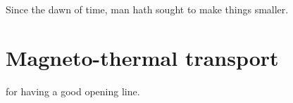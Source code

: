 \begin{savequote}[75mm]
Since the dawn of time, man hath sought to make things smaller.
\end{savequote}

\chapter{Magneto-thermal transport}
\label{ch:magneto-thermal_transport}

 for having a good opening line. 
